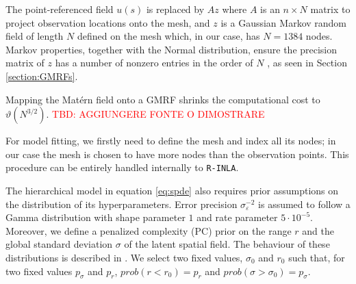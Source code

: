 \documentclass[openany]{book}
\begin{document}
The point-referenced field $u(s)$ is replaced by $A z$ where $A$ is an $n \times N$ matrix to project observation locations onto the mesh, and $z$ is a Gaussian Markov random field of length $N$ defined on the mesh which, in our case, has $N = 1384$ nodes. Markov properties, together with the Normal distribution, ensure the precision matrix of $z$ has a number of nonzero entries in the order of $N$ \citep{GMRFs}, as seen in Section \ref{section:GMRFs}. 

Mapping the Matérn field onto a GMRF shrinks the computational cost to $\vartheta(N^{3/2})$. \textcolor{red}{TBD: AGGIUNGERE FONTE O DIMOSTRARE}


For model fitting, we firstly need to define the mesh and index all its nodes; in our case the mesh is chosen to have more nodes than the observation points. This procedure can be entirely handled internally to \texttt{R-INLA}.



The hierarchical model in equation \ref{eq:spde} also requires prior assumptions on the distribution of its hyperparameters. Error precision $\sigma_{\varepsilon}^{-2}$ is assumed to follow a Gamma distribution with shape parameter $1$ and rate parameter $ 5 \cdot 10^{-5}$. Moreover, we define a penalized complexity (PC) prior \citep{PC} on the range $r$ and the global standard deviation $\sigma$ of the latent spatial field. The behaviour of these distributions is described in \cite{SPDEPC}. We select two fixed values, $\sigma_0$ and $r_0$ such that, for two fixed values $p_\sigma$ and $p_r$, $prob \left( r < r_0 \right) = p_r $ and $prob \left( \sigma > \sigma_0 \right) = p_\sigma$. 
\end{document}
